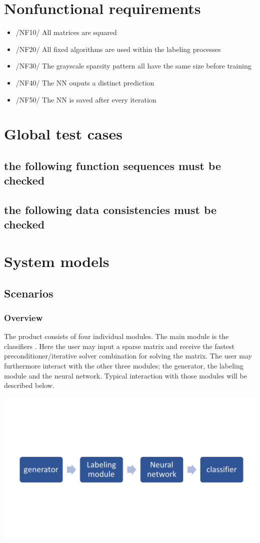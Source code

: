 \documentclass[parskip=full]{scrartcl}
\begin{document}
\section{Nonfunctional requirements}
	\begin{itemize}
		\item /NF10/ All matrices are squared
		\item /NF20/ All fixed algorithms are used within the labeling processes
		\item /NF30/ The grayscale sparsity pattern all have the same size before training
		\item /NF40/ The NN ouputs a distinct prediction
		\item /NF50/ The NN is saved after every iteration
	\end{itemize}
	

\section{Global test cases}
\subsection{the following function sequences must be checked}
\subsection{the following data consistencies must be checked}
\newpage
\section{System models}
\subsection{Scenarios}
\subsubsection{Overview}
The product consists of four individual modules. The main module is the \glspl{classifier} . Here the user may input a sparse matrix and receive the fastest preconditioner/iterative solver combination for solving the matrix. The user may furthermore interact with the other three modules; the generator, the labeling module and the neural network.  Typical interaction with those modules will be described below.
\begin{center}
\includegraphics[width=\textwidth]{workflow}
\end{center}
\end{document}
